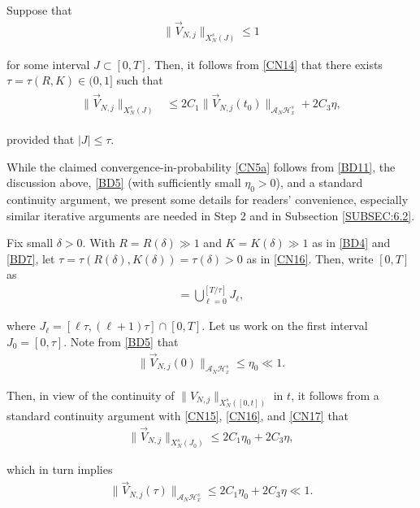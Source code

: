 \documentclass[letterpaper, 11pt,  reqno]{amsart}
\newcommand{\1}{\hspace{0.5mm}\text{I}\hspace{0.2mm}}
\newcommand{\noi}{\noindent}
\renewcommand{\H}{\mathcal{H}}
\newcommand{\dl}{\delta}
\newcommand{\A}{\mathcal{A}}
\renewcommand{\l}{\ell}
\numberwithin{equation}{section}
\numberwithin{theorem}{section}
\begin{document}
\noi
Suppose that 
\begin{align}
\|\vec  V_{N, j}\|_{X^s_{N}(J)}
\le 1
\label{CN15}
\end{align}

\noi
for some interval $J \subset [0, T]$.
Then, 
it follows from \eqref{CN14} that 
there exists $\tau = \tau (R, K) \in (0, 1]$ such that 
\begin{align}
\begin{split}
\|\vec V_{N, j}\|_{X^s_{N}(J)}
& \le 
2 C_1 
\|\vec  V_{N, j} (t_0) \|_{\A_N \H^s_x} 
+2 C_3 \eta, 
\end{split}
\label{CN16}
\end{align}

\noi
provided that $|J| \le \tau$.


While the claimed convergence-in-probability
 \eqref{CN5a}
follows from 
\eqref{BD11}, 
the discussion above, 
\eqref{BD5} (with sufficiently small $\eta_0> 0$), 
and a standard continuity argument, 
we present some details for readers' convenience, 
especially similar iterative arguments
are needed in Step 2 and in Subsection \ref{SUBSEC:6.2}.





Fix small $\dl > 0$.
With $R = R(\dl)\gg 1$ and $K = K(\dl) \gg1$
as in \eqref{BD4} and \eqref{BD7}, 
let $\tau = \tau(R(\dl), K(\dl)) = \tau(\dl)> 0$
as in \eqref{CN16}.
Then, write $[0, T]$ as
\begin{align*}
[0, T] = \bigcup_{\l = 0}^{[T/\tau]} J_\l,
\end{align*}

\noi 
where $J_\l = [\l \tau, (\l+1)\tau] \cap [0, T]$.
Let us work on the first interval $J_0 = [0, \tau]$.
Note  from \eqref{BD5} that 
\begin{align}
\|\vec  V_{N, j} (0) \|_{\A_N \H^s_x} 
\le \eta_0 \ll 1.
\label{CN17}
\end{align}

\noi
Then, in view of  the continuity 
of $\|V_{N, j}\|_{X^s_{N}([0, t])}$
in $t$, 
it follows from a standard continuity argument 
with \eqref{CN15}, \eqref{CN16}, and \eqref{CN17}
that 
\begin{align*}
\|\vec V_{N, j}\|_{X^s_{N}(J_0)}
\le  2 C_1 \eta_0 + 2C_3 \eta, 
\end{align*}

\noi
which in turn implies
\begin{align}
\|\vec  V_{N, j} (\tau ) \|_{\A_N \H^s_x} 
\le  2 C_1 \eta_0 + 2C_3 \eta \ll 1.
 \label{CN18}
\end{align}
\end{document}
